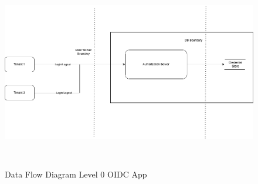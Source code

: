 \begin{figure}[h!]
\centering
\label{fig:dfd_app}
\includegraphics[width=\textwidth, height=320px]{pics/DFD_APP.png}
\caption{Data Flow Diagram Level 0 OIDC App}
\end{figure}


\label{subsec:stride}
